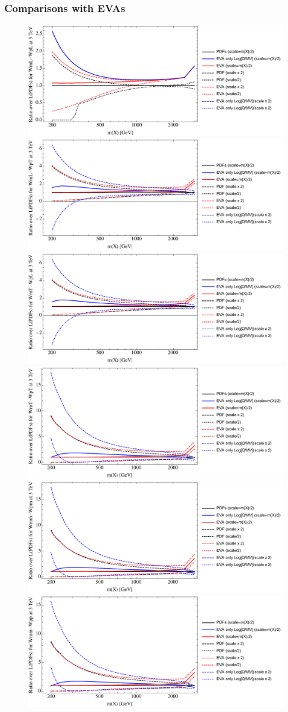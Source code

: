 \documentclass[a4paper,11pt]{article}
\begin{document}
\clearpage
\subsubsection{Comparisons with EVAs}



\begin{figure}[ht]
\includegraphics[width=0.4\linewidth]{PlotLumi/3TeV/ratios/WmL-WpL.pdf}
\includegraphics[width=0.4\linewidth]{PlotLumi/3TeV/ratios/WmL-WpT.pdf}
\includegraphics[width=0.4\linewidth]{PlotLumi/3TeV/ratios/WmT-WpL.pdf}
\includegraphics[width=0.4\linewidth]{PlotLumi/3TeV/ratios/WmT-WpT.pdf}
\includegraphics[width=0.4\linewidth]{PlotLumi/3TeV/ratios/Wmm-Wpm.pdf}
\includegraphics[width=0.4\linewidth]{PlotLumi/3TeV/ratios/Wmm-Wpp.pdf}
\end{figure}
\end{document}

